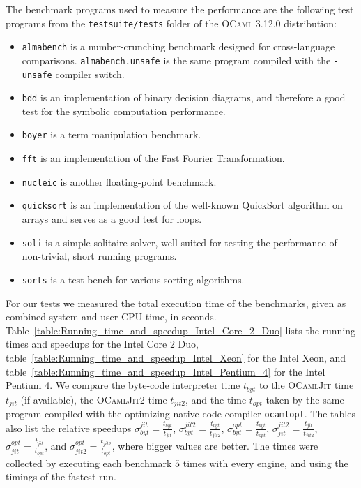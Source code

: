 \documentclass[12pt,a4paper,final]{article}
\begin{document}
The benchmark programs used to measure the performance are the following test programs from the
\texttt{testsuite/tests} folder of the \textsc{OCaml} 3.12.0 distribution:
\begin{itemize}
\item \texttt{almabench} is a number-crunching benchmark designed for cross-language
  comparisons. \texttt{almabench.unsafe} is the same program compiled with the \texttt{-unsafe}
  compiler switch.
\item \texttt{bdd} is an implementation of binary decision diagrams, and therefore a good
  test for the symbolic computation performance.
\item \texttt{boyer} is a term manipulation benchmark.
\item \texttt{fft} is an implementation of the Fast Fourier Transformation.
\item \texttt{nucleic} is another floating-point benchmark.
\item \texttt{quicksort} is an implementation of the well-known QuickSort algorithm
  on arrays and serves as a good test for loops.
\item \texttt{soli} is a simple solitaire solver, well suited for testing the performance
  of non-trivial, short running programs.
\item \texttt{sorts} is a test bench for various sorting algorithms.
\end{itemize}
For our tests we measured the total execution time of the benchmarks, given as combined
system and user CPU time, in seconds.
Table~\ref{table:Running_time_and_speedup_Intel_Core_2_Duo}
lists the running times and speedups for the Intel Core 2 Duo,
table~\ref{table:Running_time_and_speedup_Intel_Xeon}
for the Intel Xeon,
and table~\ref{table:Running_time_and_speedup_Intel_Pentium_4}
for the Intel Pentium 4. We compare the byte-code interpreter time $t_{byt}$ to
the \textsc{OCamlJit} time $t_{jit}$ (if available), the \textsc{OCamlJit2} time
$t_{jit2}$, and the time $t_{opt}$ taken by the same program compiled with the
optimizing native code compiler \texttt{ocamlopt}. The tables also list the relative
speedups
$\sigma^{jit}_{byt} = \frac{t_{byt}}{t_{jit}}$,
$\sigma^{jit2}_{byt} = \frac{t_{byt}}{t_{jit2}}$,
$\sigma^{opt}_{byt} = \frac{t_{byt}}{t_{opt}}$,
$\sigma^{jit2}_{jit} = \frac{t_{jit}}{t_{jit2}}$,
$\sigma^{opt}_{jit} = \frac{t_{jit}}{t_{opt}}$, and
$\sigma^{opt}_{jit2} = \frac{t_{jit2}}{t_{opt}}$, where bigger values are better. The
times were collected by executing each benchmark $5$ times with every engine, and
using the timings of the fastest run.
\end{document}
